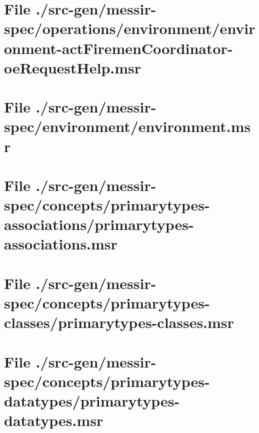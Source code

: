 \section[File /src-gen.../environment-actFiremenCoordinator-oeRequestHelp.msr]{File ./src-gen/messir-spec/operations/environment/environment-actFiremenCoordinator-oeRequestHelp.msr}
\scriptsize

\normalsize
	
\section[File /src-gen/messir-spec/environment/environment.msr]{File ./src-gen/messir-spec/environment/environment.msr}
\scriptsize

\normalsize
	
\section[File /src-gen/messir-spec/concepts.../primarytypes-associations.msr]{File ./src-gen/messir-spec/concepts/primarytypes-associations/primarytypes-associations.msr}
\scriptsize

\normalsize
	
\section[File /src-gen/messir-spec/concepts/primarytypes-classes/primarytypes-classes.msr]{File ./src-gen/messir-spec/concepts/primarytypes-classes/primarytypes-classes.msr}
\scriptsize

\normalsize
	
\section[File /src-gen/messir-spec/concepts.../primarytypes-datatypes.msr]{File ./src-gen/messir-spec/concepts/primarytypes-datatypes/primarytypes-datatypes.msr}
\scriptsize

\normalsize
	
